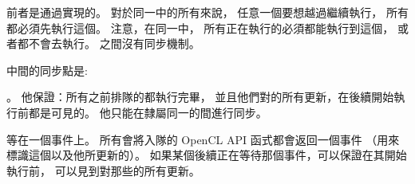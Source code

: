 前者是通過實現的。
對於同一中的所有來說，
任意一個要想越過繼續執行，
所有都必須先執行這個。
注意，在同一中，
所有正在執行的必須都能執行到這個，
或者都不會去執行。
之間沒有同步機制。

中間的同步點是:
\startigBase
\item {}。
他保證：所有之前排隊的都執行完畢，
並且他們對的所有更新，在後續開始執行前都是可見的。
他只能在隸屬同一的間進行同步。

\item 等在一個事件上。
所有會將入隊的 OpenCL API 函式都會返回一個事件
（用來標識這個以及他所更新的）。
如果某個後續正在等待那個事件，可以保證在其開始執行前，
可以見到對那些的所有更新。
\stopigBase

